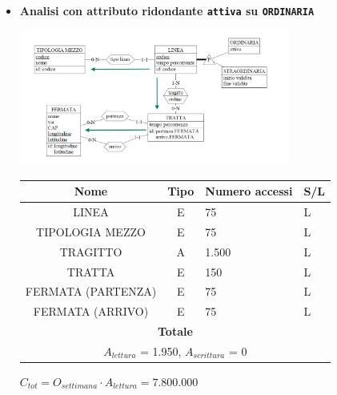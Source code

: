 \documentclass[12pt,a4paper]{report}
\begin{document}
\begin{enumerate}[label=\textbf{\arabic*}]
    \begin{itemize}
    \item \textbf{Analisi con attributo ridondante \texttt{attiva} su \texttt{ORDINARIA}}
    \begin{center}
    \includegraphics[width=0.7\textwidth]{VisualLineeRid}
    \end{center}
    \begin{table}[H]
    \centering
    \begin{tabular}{|c|c|l|l|}
    \hline
    \textbf{Nome} & \textbf{Tipo} & \textbf{Numero accessi} & \textbf{S/L} \\
    \hline
    LINEA & E & 75 & L \\
    \hline
    TIPOLOGIA MEZZO & E & 75 & L \\
    \hline
    TRAGITTO & A & 1.500 & L \\
    \hline
    TRATTA & E & 150 & L \\
    \hline
    FERMATA (PARTENZA) & E & 75 & L \\
    \hline
    FERMATA (ARRIVO) & E & 75 & L \\
    \hline
    \multicolumn{4}{c}{\textbf{Totale}} \\
    \multicolumn{4}{c}{${A_{lettura}}$ = 1.950, ${A_{scrittura}}$ = 0} \\
    \hline
    \end{tabular}
    \end{table}
    \begin{center}
    ${C_{tot} = {O_{settimana}}\cdot{A_{lettura}}= 7.800.000}$
    \end{center}


\end{itemize}
\end{enumerate}
\end{document}
